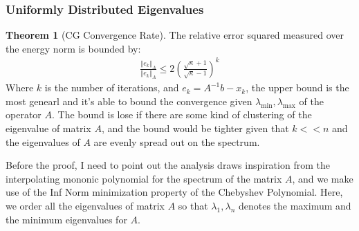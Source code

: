 \documentclass[]{article}
\theoremstyle{definition}
\newtheorem{theorem}{Theorem}            %
\begin{document}
        \subsubsection{Uniformly Distributed Eigenvalues}
            \begin{theorem}[CG Convergence Rate]
                The relative error squared measured over the energy norm is bounded by: 
                \begin{align}
                    \frac{\Vert e_k\Vert_A}{\Vert e_k\Vert_A}
                    \le 2 \left(
                            \frac{\sqrt{\kappa} + 1}{\sqrt{\kappa} - 1}
                    \right)^k
                \end{align}
                Where $k$ is the number of iterations, and $e_k = A^{-1}b - x_k$, the upper bound is the most genearl and it's able to bound the convergence given $\lambda_{\min}, \lambda_{\max}$ of the operator $A$. The bound is lose if there are some kind of clustering of the eigenvalue of matrix $A$, and the bound would be tighter given that $k<<n$ and the eigenvalues of $A$ are evenly spread out on the spectrum. 
            \end{theorem}
            Before the proof, I need to point out the analysis draws inspiration from the interpolating mononic polynomial for the spectrum of the matrix $A$, and we make use of the Inf Norm minimization property of the Chebyshev Polynomial. Here, we order all the eigenvalues of matrix $A$ so that $\lambda_1, \lambda_n$ denotes the maximum and the minimum eigenvalues for $A$. 
\end{document}
